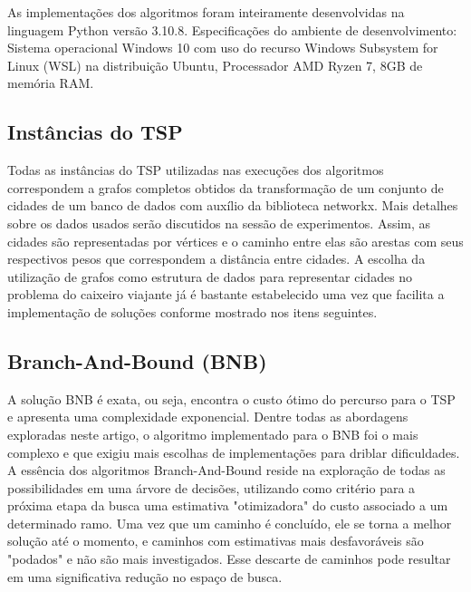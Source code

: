 \documentclass[12pt]{article}
\begin{document}
As implementações dos algoritmos foram inteiramente desenvolvidas na linguagem Python versão 3.10.8. Especificações do ambiente de desenvolvimento: Sistema operacional Windows 10 com uso do recurso Windows Subsystem for Linux (WSL) na distribuição Ubuntu, Processador AMD Ryzen 7, 8GB de memória RAM.

\subsection{Instâncias do TSP}

Todas as instâncias do TSP utilizadas nas execuções dos algoritmos correspondem a grafos completos obtidos da transformação de um conjunto de cidades de um banco de dados com auxílio da biblioteca networkx. Mais detalhes sobre os dados usados serão discutidos na sessão de experimentos. Assim, as cidades são representadas por vértices e o caminho entre elas são arestas com seus respectivos pesos que correspondem a distância entre cidades. A escolha da utilização de grafos como estrutura de dados para representar cidades no problema do caixeiro viajante já é bastante estabelecido uma vez que facilita a implementação de soluções conforme mostrado nos itens seguintes.

\subsection{Branch-And-Bound (BNB)}

A solução BNB é exata, ou seja, encontra o custo ótimo do percurso para o TSP e apresenta uma complexidade exponencial. Dentre todas as abordagens exploradas neste artigo, o algoritmo implementado para o BNB foi o mais complexo e que exigiu mais escolhas de implementações para driblar dificuldades. A essência dos algoritmos Branch-And-Bound reside na exploração de todas as possibilidades em uma árvore de decisões, utilizando como critério para a próxima etapa da busca uma estimativa "otimizadora" do custo associado a um determinado ramo. Uma vez que um caminho é concluído, ele se torna a melhor solução até o momento, e caminhos com estimativas mais desfavoráveis são "podados" e não são mais investigados. Esse descarte de caminhos pode resultar em uma significativa redução no espaço de busca.
\end{document}
